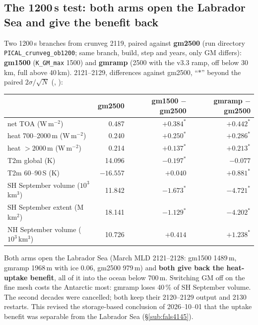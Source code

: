 \documentclass[10pt]{article}
\begin{document}
\subsection{The 1200\,s test: both arms open the Labrador Sea and give the benefit back}\label{sub:r43gm1500}

Two 1200\,s branches from crunveg 2119, paired against \textbf{gm2500} (run directory
\texttt{PICAL\_crunveg\_ob1200}; same branch, build, step and years, only GM differs):
\textbf{gm1500} (\texttt{K\_GM\_max} 1500) and \textbf{gmramp} (2500 with the v3.3 ramp, off below
30\,km, full above 40\,km). 2121--2129, differences against gm2500, ``$*$'' beyond the paired
$2\sigma/\sqrt{N}$ (,
):

\begin{center}\small
\begin{tabular}{lrrr}
\toprule
 & gm2500 & gm1500 $-$ gm2500 & gmramp $-$ gm2500 \\
\midrule
net TOA (W\,m$^{-2}$)            & 0.487 & $+0.384^*$ & $+0.442^*$ \\
heat 700--2000\,m (W\,m$^{-2}$)  & 0.240 & $+0.250^*$ & $+0.286^*$ \\
heat $>$2000\,m (W\,m$^{-2}$)    & 0.214 & $+0.137^*$ & $+0.213^*$ \\
T2m global (K)                   & 14.096 & $-0.197^*$ & $-0.077$ \\
T2m 60--90\,S (K)                & $-16.557$ & $+0.040$ & $+0.881^*$ \\
SH September volume ($10^3$\,km$^3$) & 11.842 & $-1.673^*$ & $-4.721^*$ \\
SH September extent (M\,km$^2$)  & 18.141 & $-1.129^*$ & $-4.202^*$ \\
NH September volume ($10^3$\,km$^3$) & 10.726 & $+0.414$ & $+1.238^*$ \\
\bottomrule
\end{tabular}
\end{center}

Both arms open the Labrador Sea (March MLD 2121--2128: gm1500 1489\,m, gmramp 1968\,m with ice
0.06, gm2500 979\,m) and \textbf{both give back the heat-uptake benefit}, all of it into the ocean
below 700\,m. Switching GM off on the fine mesh costs the Antarctic most: gmramp loses 40\,\% of
SH September volume. The second decades were cancelled; both keep their 2120--2129 output and 2130
restarts. This revised the storage-based conclusion of 2026--10--01 that the uptake benefit was
separable from the Labrador Sea (\S\ref{sub:fals4145}).
\end{document}
